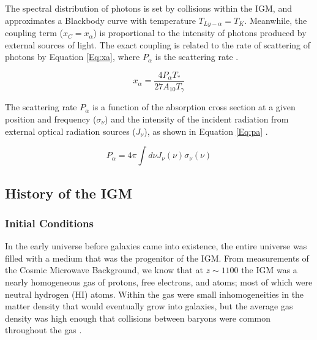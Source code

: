 The spectral distribution of \lya photons is set by collisions within the IGM, and approximates a Blackbody curve with temperature $T_{Ly-\alpha} = T_K$. Meanwhile, the \lya  coupling term ($x_C = x_{\alpha}$) is proportional to the intensity of \lya  photons produced by external sources of light. The exact \lya  coupling is related to the rate of scattering of \lya  photons by Equation \ref{Eq:xa}, where $P_{\alpha}$ is the scattering rate \cite{furlanetto_2006}. 

\begin{equation}\label{Eq:xa}
x_{\alpha} = \frac{4 P_{\alpha} T_*}{27 A_{10} T_{\gamma}}
\end{equation}

The scattering rate $P_{\alpha}$ is a function of the absorption cross section at a given position and frequency ($\sigma_{\nu}$) and the intensity of the incident radiation from external optical radiation sources ($J_{\nu}$), as shown in Equation \ref{Eq:pa} \cite{furlanetto_2006}. 

\begin{equation}\label{Eq:pa}
P_{\alpha} = 4 \pi \int d\nu J_{\nu}(\nu) \sigma_{\nu}(\nu)
\end{equation}


\subsection{History of the IGM} \label{Sec:IGMhist}

\subsubsection{Initial Conditions}

In the early universe before galaxies came into existence, the entire universe was filled with a medium that was the progenitor of the IGM. From measurements of the Cosmic Microwave Background, we know that at $z \sim 1100$ the IGM was a nearly homogeneous gas of protons, free electrons, and atoms; most of which were neutral hydrogen (HI) atoms. Within the gas were small inhomogeneities in the matter density that would eventually grow into galaxies, but the average gas density was high enough that collisions between baryons were common throughout the gas \cite{furlanetto_2006}. 

